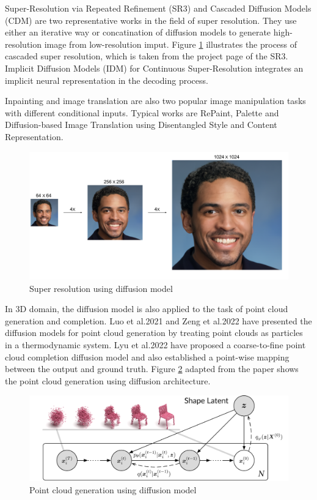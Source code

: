 \documentclass[12pt,DIV14,BCOR12mm,a4paper,footinclude=false,headinclude,parskip=half-,twoside,openright,cleardoublepage=empty,toc=index,bibliography=totoc,listof=totoc]{scrreprt}
\numberwithin{equation}{chapter}
\begin{document}
Super-Resolution via Repeated Refinement (SR3)\cite{saharia2021image} and Cascaded Diffusion Models (CDM)\cite{ho2021cascaded} are two representative works in the field of super resolution. They use either an iterative way or concatination of diffusion models to generate high-resolution image from low-resolution imput. Figure \ref{img:sr3} illustrates the process of cascaded super resolution, which is taken from the project page of the SR3. Implicit Diffusion Models (IDM) for Continuous Super-Resolution\cite{gao2023implicit} integrates an implicit neural representation in the decoding process.

Inpainting and image translation are also two popular image manipulation tasks with different conditional inputs. Typical works are RePaint\cite{lugmayr2022repaint}, Palette\cite{saharia2022palette} and Diffusion-based Image Translation using Disentangled Style and Content Representation\cite{kwon2023diffusionbased}.
\begin{figure}[h]
	\centering
	\includegraphics[scale=.08]{img/cascade_fig.png}
	\caption{Super resolution using diffusion model}
	\label{img:sr3}
\end{figure}


In 3D domain, the diffusion model is also applied to the task of point cloud generation and completion. Luo et al.2021\cite{luo2021diffusion} and Zeng et al.2022\cite{zeng2022lion} have presented the diffusion models for point cloud generation by treating point clouds as particles in a thermodynamic system. Lyu et al.2022\cite{lyu2022conditional} have proposed a coarse-to-fine point cloud completion diffusion model and also established a point-wise mapping between the output and ground truth. Figure \ref{img:pcd} adapted from the paper shows the point cloud generation using diffusion architecture.

\begin{figure}[h]
	\centering
	\includegraphics[scale=1.8]{img/teaser.png}
	\caption{Point cloud generation using diffusion model}
	\label{img:pcd}
\end{figure}
\end{document}
